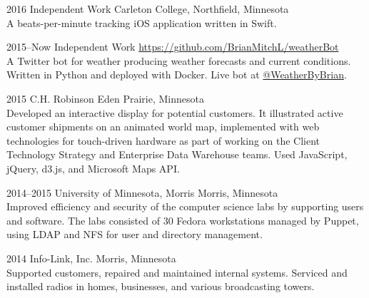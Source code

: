 \documentclass[]{cv-style} %
\begin{document}
\begin{entrylist}


\entry
{2016}
{Independent Work}
{Carleton College, Northfield, Minnesota}
{ \\
A beats-per-minute tracking iOS application written in Swift.}


\entry
{2015--Now}
{Independent Work}
{\href{https://github.com/BrianMitchL/weatherBot}{https://github.com/BrianMitchL/weatherBot}}
{ \\
A Twitter bot for weather producing weather forecasts and current conditions. Written in Python and deployed with Docker. Live bot at \href{https://twitter.com/WeatherByBrian}{@WeatherByBrian}.}


\entry
{2015}
{C.H. Robinson}
{Eden Prairie, Minnesota}
{ \\
Developed an interactive display for potential customers. It illustrated active customer shipments on an animated world map, implemented with web technologies for touch-driven hardware as part of working on the Client Technology Strategy and Enterprise Data Warehouse teams. Used JavaScript, jQuery, d3.js, and Microsoft Maps API.}


\entry
{2014--2015}
{University of Minnesota, Morris}
{Morris, Minnesota}
{ \\
Improved efficiency and security of the computer science labs by supporting users and software. The labs consisted of 30 Fedora workstations managed by Puppet, using LDAP and NFS for user and directory management.}


\entry
{2014}
{Info-Link, Inc.}
{Morris, Minnesota}
{ \\
Supported customers, repaired and maintained internal systems. Serviced and installed radios in homes, businesses, and various broadcasting towers.}


\end{entrylist}
\end{document}
